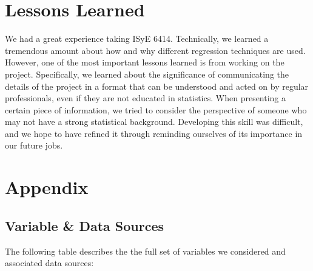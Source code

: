 \documentclass[]{article}
\begin{document}
\section{Lessons Learned}\label{lessons-learned}

We had a great experience taking ISyE 6414. Technically, we learned a
tremendous amount about how and why different regression techniques are
used. However, one of the most important lessons learned is from working
on the project. Specifically, we learned about the significance of
communicating the details of the project in a format that can be
understood and acted on by regular professionals, even if they are not
educated in statistics. When presenting a certain piece of information,
we tried to consider the perspective of someone who may not have a
strong statistical background. Developing this skill was difficult, and
we hope to have refined it through reminding ourselves of its importance
in our future jobs.

\newpage 

\section{Appendix}\label{appendix}

\subsection{Variable \& Data Sources}\label{variable-data-sources}

The following table describes the the full set of variables we
considered and associated data sources:
\end{document}
